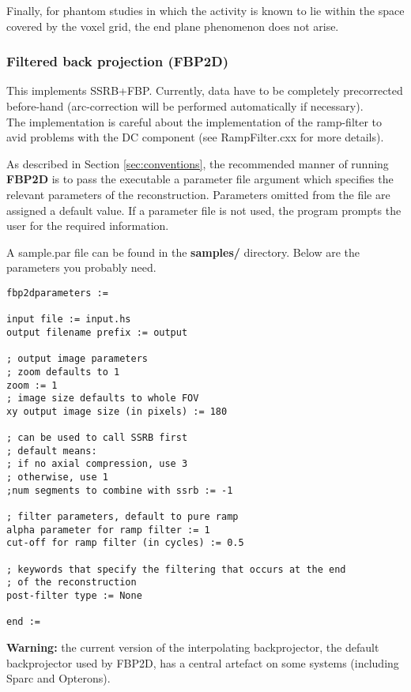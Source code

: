 \documentclass{article}
\begin{document}
Finally, for phantom studies in which the activity is known to 
lie within the space covered by the voxel grid, the end plane 
phenomenon does not arise.



\subsubsection{
Filtered back projection (FBP2D)}

This implements SSRB+FBP. Currently, data have to be completely 
precorrected before-hand (arc-correction will be performed automatically
if necessary).\\
The implementation is careful about the implementation of the 
ramp-filter to avid problems with the DC component (see RampFilter.cxx 
for more details).



As described in Section \ref{sec:conventions}, the recommended manner of running \textbf{FBP2D}  
is to pass the executable a parameter file argument which specifies 
the relevant parameters of the reconstruction. Parameters omitted 
from the file are assigned a default value. If a parameter file 
is not used, the program prompts the user for the required information.


A sample.par file can be found in the \textbf{samples/} directory. 
Below are the parameters you probably need.


\begin{verbatim}
fbp2dparameters :=

input file := input.hs
output filename prefix := output

; output image parameters
; zoom defaults to 1
zoom := 1
; image size defaults to whole FOV
xy output image size (in pixels) := 180

; can be used to call SSRB first
; default means: 
; if no axial compression, use 3 
; otherwise, use 1
;num segments to combine with ssrb := -1

; filter parameters, default to pure ramp
alpha parameter for ramp filter := 1
cut-off for ramp filter (in cycles) := 0.5

; keywords that specify the filtering that occurs at the end
; of the reconstruction
post-filter type := None

end := 
\end{verbatim}

\textbf{Warning:} the current version of the interpolating backprojector, 
the default backprojector used by FBP2D, has a central artefact 
on some systems (including Sparc and Opterons). 
\end{document}
